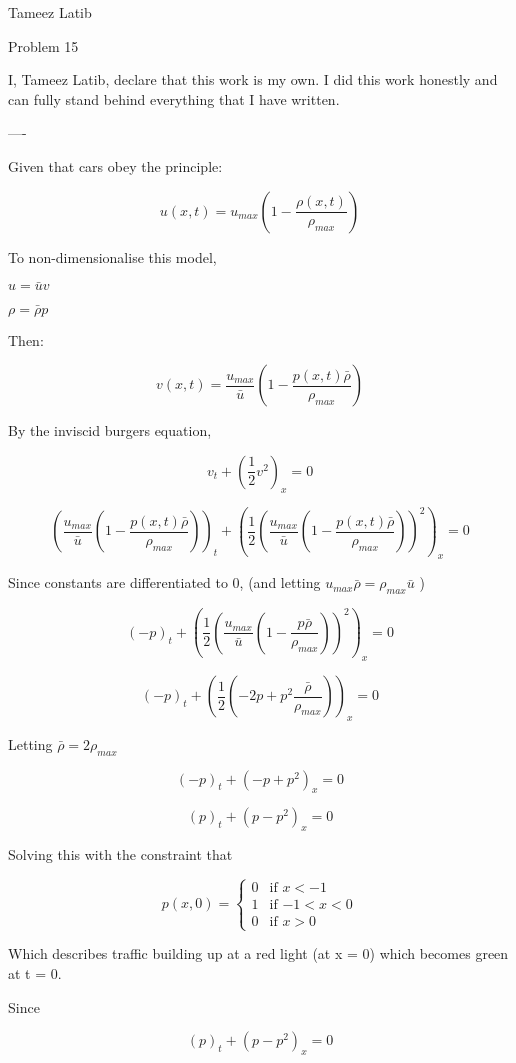 \documentclass{article}
\begin{document}
Tameez Latib

Problem 15

I, Tameez Latib, declare that this work is my own. I did this work honestly and can fully stand behind everything that I have written.

----

Given that cars obey the principle: 

$$u(x, t) = u_{max} (1 - \frac{\rho(x, t)}{\rho_{max}})$$

To non-dimensionalise this model, 

$u = \bar{u}v$ 

$\rho = \bar{\rho}p$ 

Then: 

$$v(x, t) = \frac{u_{max}}{\bar{u}} (1 - \frac{p(x, t)\bar{\rho}}{\rho_{max}})$$


By the inviscid burgers equation, 

$$v_t + (\frac{1}{2} v^2)_x = 0$$

$$(\frac{u_{max}}{\bar{u}} (1 - \frac{p(x, t)\bar{\rho}}{\rho_{max}}))_t + (\frac{1}{2} (\frac{u_{max}}{\bar{u}} (1 - \frac{p(x, t)\bar{\rho}}{\rho_{max}}))^2)_x = 0 $$

Since constants are differentiated to 0, (and letting $ u_{max} \bar{\rho} = \rho_{max} \bar{u}$ )

$$(-p)_t + (\frac{1}{2} (\frac{u_{max}}{\bar{u}} (1 - \frac{p\bar{\rho}}{\rho_{max}}))^2)_x = 0 $$

$$(-p)_t + (\frac{1}{2} (-2p+p^2 \frac{\bar{\rho}}{\rho_{max}} ) )_x = 0 $$

Letting ${\bar{\rho}}= 2{\rho_{max}} $

$$(-p)_t + (-p+p^2)_x = 0 $$

$$(p)_t + (p-p^2)_x = 0 $$

Solving this with the constraint that 

\begin{equation*}
p(x, 0) = 
\begin{cases}
0 & \text{if $x < -1$}\\
1 & \text{if $-1 < x < 0$}\\
0 & \text{if $x > 0$} 
\end{cases}
\end{equation*}

Which describes traffic building up at a red light (at x = 0) which becomes green at t = 0.

Since

$$(p)_t + (p-{p^2})_x = 0$$ 
\end{document}
